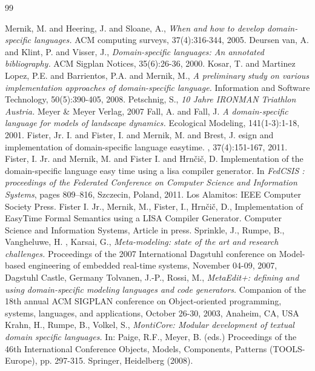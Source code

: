 \documentclass[preprint, prX]{revtex4}
\begin{document}
\begin {thebibliography} {99}

 Mernik, M. and Heering, J. and Sloane, A., \textit{When and how to develop domain-specific languages.} ACM
computing surveys, 37(4):316-344, 2005.
 {D}eursen van, A. and Klint, P. and Visser, J., \textit{Domain-specific languages: An annotated
bibliography.} ACM Sigplan Notices, 35(6):26-36, 2000.
 Kosar, T. and Martinez Lopez, P.E. and Barrientos, P.A. and Mernik, M., \textit{A preliminary study on various
implementation approaches of domain-specific language.} Information and Software Technology, 50(5):390-405, 2008.
 Petschnig, S., \textit{10 Jahre IRONMAN Triathlon Austria.} Meyer \& Meyer Verlag, 2007
 Fall, A. and Fall, J. \textit{ A domain-specific language for models of landscape dynamics.} Ecological Modeling,
141(1-3):1-18, 2001.
Fister, Jr. I. and Fister, I. and Mernik, M. and Brest, J.
esign and implementation of domain-specific language easytime.
, 37(4):151-167, 2011.
Fister, I. Jr. and Mernik, M. and Fister I. and Hrn\v{c}i\v{c}, D.
\newblock Implementation of the domain-specific language easy time using a lisa
compiler generator.
\newblock In {\em FedCSIS :
proceedings of the Federated Conference on Computer Science and Information
Systems}, pages 809--816, Szczecin, Poland, 2011. Los Alamitos: IEEE Computer
Society Press.
Fister I. Jr., Mernik, M., Fister, I., Hrn\v{c}i\v{c}, D., Implementation of EasyTime Formal Semantics using a LISA Compiler Generator. Computer Science and Information Systems, Article in press.
 Sprinkle, J., Rumpe, B., Vangheluwe, H. , Karsai, G., \textit{Meta-modeling: state of the art and research challenges.} Proceedings of the 2007 International Dagstuhl conference on Model-based engineering of embedded real-time systems, November 04-09, 2007, Dagstuhl Castle, Germany
 Tolvanen, J.-P., Rossi, M., \textit{MetaEdit+: defining and using domain-specific modeling languages and code generators.} Companion of the 18th annual ACM SIGPLAN conference on Object-oriented programming, systems, languages, and applications, October 26-30, 2003, Anaheim, CA, USA 
 Krahn, H., Rumpe, B., Volkel, S., \textit{MontiCore: Modular development of textual domain specific languages.} In: Paige, R.F., Meyer, B. (eds.) Proceedings of the 46th International Conference Objects, Models, Components, Patterns (TOOLS-Europe), pp. 297-315. Springer, Heidelberg (2008).

\end{thebibliography}
\end{document}
